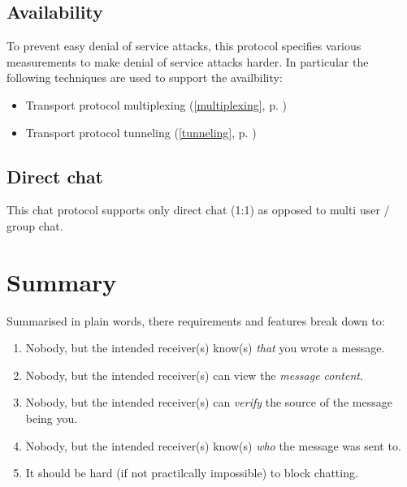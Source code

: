 \subsection{Availability}
To prevent easy denial of service attacks, this protocol specifies various
measurements to make denial of service attacks harder. In particular
the following techniques are used to support the availbility:
\begin{itemize}
\item Transport protocol multiplexing (\ref{multiplexing}, p. \pageref{multiplexing})
\item Transport protocol tunneling (\ref{tunneling}, p. \pageref{tunneling})
\end{itemize}
\subsection{Direct chat}
This chat protocol supports only direct chat (1:1) as opposed 
to multi user / group chat.
\section{Summary}
Summarised in plain words, there requirements and features break down to:
\begin{enumerate}
\item Nobody, but the intended receiver(s) know(s) \emph{that} you wrote a message.
\item Nobody, but the intended receiver(s) can view the \emph{message content}.
\item Nobody, but the intended receiver(s) can \emph{verify} the source of the message being you.
\item Nobody, but the intended receiver(s) know(s) \emph{who} the message was sent to.
\item It should be hard (if not practilcally impossible) to block chatting.
\end{enumerate}
